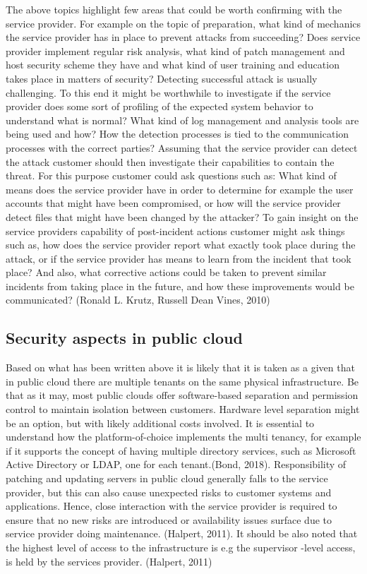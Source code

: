 \documentclass{article}
\begin{document}
The above topics highlight few areas that could be worth confirming with the service provider. For example on the topic of preparation, what kind of mechanics the service provider has in place to prevent attacks from succeeding? Does service provider implement regular risk analysis, what kind of patch management and host security scheme they have and what kind of user training and education takes place in matters of security? Detecting successful attack is usually challenging. To this end it might be worthwhile to investigate if the service provider does some sort of profiling of the expected system behavior to understand what is normal? What kind of log management and analysis tools are being used and how? How the detection processes is tied to the communication processes with the correct parties? Assuming that the service provider can detect the attack customer should then investigate their capabilities to contain the threat. For this purpose customer could ask questions such as: What kind of means does the service provider have in order to determine for example the user accounts that might have been compromised, or how will the service provider detect files that might have been changed by the attacker? To gain insight on the service providers capability of post-incident actions customer might ask things such as, how does the service provider report what exactly took place during the attack, or if the service provider has means to learn from the incident that took place? And also, what corrective actions could be taken to prevent similar incidents from taking place in the future, and how these improvements would be communicated? (Ronald L. Krutz, Russell Dean Vines, 2010)
\subsection{Security aspects in public cloud}
Based on what has been written above it is likely that it is taken as a given that in public cloud there are multiple tenants on the same physical infrastructure.
Be that as it may, most public clouds offer software-based separation and permission control to maintain isolation between customers. Hardware level separation might be an option, but with likely additional costs involved. It is essential to understand how the platform-of-choice implements the multi tenancy, for example if it supports the concept of having multiple directory services, such as Microsoft Active Directory or LDAP, one for each tenant.(Bond, 2018).
Responsibility of patching and updating servers in public cloud generally falls to the service provider, but this can also cause unexpected risks to customer systems and applications. Hence, close interaction with the service provider is required to ensure that no new risks are introduced  or availability issues surface due to service provider doing maintenance. (Halpert, 2011).
It should be also noted that the highest level of access to the infrastructure is e.g the supervisor -level access, is held by the services provider. (Halpert, 2011)
\end{document}
